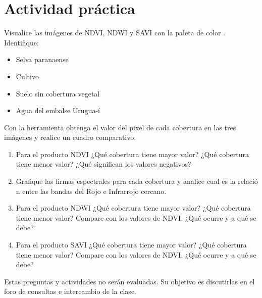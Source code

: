 %






\section{Actividad práctica}

Visualice las imágenes de NDVI, NDWI y SAVI con la paleta de color . Identifique:

  \begin{itemize}
  \item Selva paranaense
  \item Cultivo
  \item Suelo sin cobertura vegetal
  \item Agua del embalse Urugua-í
  \end{itemize}

Con la herramienta  obtenga el valor del pixel de cada cobertura en las tres imágenes y realice un cuadro comparativo.

\begin{enumerate}
\item Para el producto NDVI ¿Qué cobertura tiene mayor valor? ¿Qué cobertura tiene menor valor? ¿Qué significan los valores negativos?
\item Grafique las firmas espectrales para cada cobertura y analice cual es la relació n entre las bandas del Rojo e Infrarrojo cercano.
\item Para el producto NDWI ¿Qué cobertura tiene mayor valor? ¿Qué cobertura tiene menor valor? Compare con los valores de NDVI, ¿Qué ocurre y a qué se debe?
\item Para el producto SAVI ¿Qué cobertura tiene mayor valor? ¿Qué cobertura tiene menor valor? Compare con los valores de NDVI, ¿Qué ocurre y a qué se debe?

\end{enumerate}



Estas preguntas y actividades no serán evaluadas. Su objetivo es discutirlas en el foro de consultas e intercambio de la clase.



